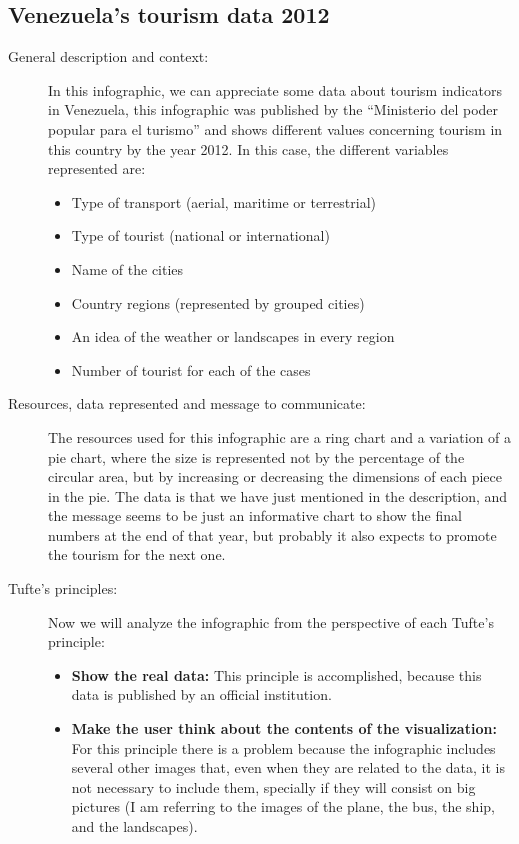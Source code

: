 \documentclass{article}
\begin{document}
\subsection{Venezuela's tourism data 2012}
  \begin{description}
    \item[General description and context:] In this infographic, we can appreciate some data about tourism indicators in Venezuela, this infographic was published by the ``Ministerio del poder popular para el turismo'' and shows different values concerning tourism in this country by the year 2012. In this case, the different variables represented are:
    \begin{itemize}
      \item Type of transport (aerial, maritime or terrestrial)
      \item Type of tourist (national or international)
      \item Name of the cities
      \item Country regions (represented by grouped cities)
      \item An idea of the weather or landscapes in every region
      \item Number of tourist for each of the cases
    \end{itemize}
    \item[Resources, data represented and message to communicate:] The resources used for this infographic are a ring chart and a variation of a pie chart, where the size is represented not by the percentage of the circular area, but by increasing or decreasing the dimensions of each piece in the pie. The data is that we have just mentioned in the description, and the message seems to be just an informative chart to show the final numbers at the end of that year, but probably it also expects to promote the tourism for the next one.
    \item[Tufte's principles:]Now we will analyze the infographic from the perspective of each Tufte's principle:
    \begin{itemize}
      \item \textbf{Show the real data:} This principle is accomplished, because this data is published by an official institution.
      \item \textbf{Make the user think about the contents of the visualization:}
        For this principle there is a problem because the infographic includes several other images that, even when they are related to the data, it is not necessary to include them, specially if they will consist on big pictures (I am referring to the images of the plane, the bus, the ship, and the landscapes).

\end{itemize}
\end{description}
\end{document}
